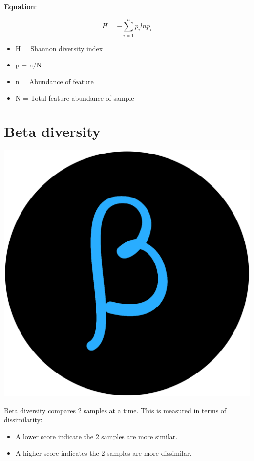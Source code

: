 \documentclass[
]{book}
\providecommand{\tightlist}{%
  \setlength{\itemsep}{0pt}\setlength{\parskip}{0pt}}
\begin{document}
\textbf{Equation}:

\[
H =
-\sum_{i=1}^{n} p_i lnp_i
\]

\begin{itemize}
\tightlist
\item
  H = Shannon diversity index
\item
  p = n/N
\item
  n = Abundance of feature
\item
  N = Total feature abundance of sample
\end{itemize}

\hypertarget{beta_appendix}{%
\section{Beta diversity}\label{beta_appendix}}

\includegraphics{figures/beta.png}

Beta diversity compares 2 samples at a time. This is measured in terms of dissimilarity:

\begin{itemize}
\tightlist
\item
  A lower score indicate the 2 samples are more similar.
\item
  A higher score indicates the 2 samples are more dissimilar.
\end{itemize}
\end{document}
